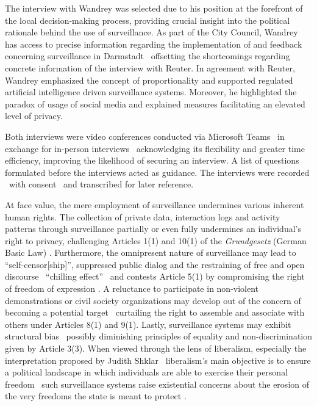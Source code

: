 \documentclass[12pt]{article}
\begin{document}
	The interview with Wandrey was selected due to his position at the forefront of the local decision-making process, providing crucial insight into the political rationale behind the use of surveillance. As part of the City Council, Wandrey has access to precise information regarding the implementation of and feedback concerning surveillance in Darmstadt \textemdash\ offsetting the shortcomings regarding concrete information of the interview with Reuter. In agreement with Reuter, Wandrey emphasized the concept of proportionality and supported regulated artificial intelligence driven surveillance systems. Moreover, he highlighted the paradox of usage of social media and explained measures facilitating an elevated level of privacy.
	
	Both interviews were video conferences conducted via Microsoft Teams \textemdash\ in exchange for in-person interviews \textemdash\ acknowledging its flexibility and greater time efficiency, improving the likelihood of securing an interview. A list of questions formulated before the interviews acted as guidance. The interviews were recorded \textemdash\ with consent \textemdash\ and transcribed for later reference.
	
	At face value, the mere employment of surveillance undermines various inherent human rights. The collection of private data, interaction logs and activity patterns through surveillance partially or even fully undermines an individual's right to privacy, challenging Articles 1(1) and 10(1) of the \textit{Grundgesetz} (German Basic Law) \parencites{nandy2023, wetzling2023, grundgesetz2025}. Furthermore, the omnipresent nature of surveillance may lead to ``self-censor[ship]'', suppressed public dialog and the restraining of free and open discourse \textemdash\ ``chilling effect'' \textemdash\ and contests Article 5(1) by compromising the right of freedom of expression \parencite{murray2024}. A reluctance to participate in non-violent demonstrations or civil society organizations may develop out of the concern of becoming a potential target \textemdash\ curtailing the right to assemble and associate with others under Articles 8(1) and 9(1). Lastly, surveillance systems may exhibit structural bias \textemdash\ possibly diminishing principles of equality and non-discrimination given by Article 3(3). When viewed through the lens of liberalism, especially the interpretation proposed by Judith Shklar \textemdash\ liberalism's main objective is to ensure a political landscape in which individuals are able to exercise their personal freedom \textemdash\ such surveillance systems raise existential concerns about the erosion of the very freedoms the state is meant to protect \parencite[684]{bell2014}.
	
\end{document}
